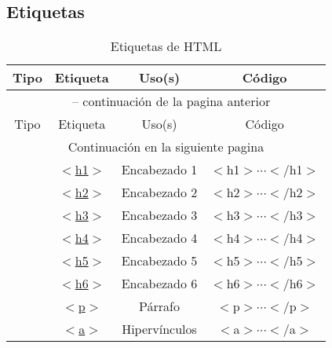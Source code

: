 \documentclass[12pt]{report}
\begin{document}
		\subsection{Etiquetas}
			\begin{longtable}{c >{\ttfamily} c c >{\ttfamily\footnotesize} c}
				\caption{Etiquetas de HTML}\\
				Tipo	&	Etiqueta	&	Uso(s)	&	Código	\\\hline
				\endfirsthead
				\multicolumn{4}{c}{\tablename\ \thetable{} -- continuación de la pagina anterior}\\
				Tipo	&	Etiqueta	&	Uso(s)	&	Código	\\\hline
				\endhead
				\hline\multicolumn{4}{c}{Continuación en la siguiente pagina}\\\hline
				\endfoot
				\hline
				\endlastfoot
				\multirow{7}{*}{\rotatebox[origin=c]{90}{De texto}}
					&	\href{https://developer.mozilla.org/es/docs/Web/HTML/Element/Heading_Elements}{$<$h1$>$}
						&	Encabezado 1	&	$<$h1$>\cdots<$/h1$>$	\\
					&	\href{https://developer.mozilla.org/es/docs/Web/HTML/Element/Heading_Elements}{$<$h2$>$}
						&	Encabezado 2	& $<$h2$>\cdots<$/h2$>$	\\
					&	\href{https://developer.mozilla.org/es/docs/Web/HTML/Element/Heading_Elements}{$<$h3$>$}
						&	Encabezado 3	& $<$h3$>\cdots<$/h3$>$	\\
					&	\href{https://developer.mozilla.org/es/docs/Web/HTML/Element/Heading_Elements}{$<$h4$>$}
						&	Encabezado 4	& $<$h4$>\cdots<$/h4$>$	\\
					&	\href{https://developer.mozilla.org/es/docs/Web/HTML/Element/Heading_Elements}{$<$h5$>$}
						&	Encabezado 5	& $<$h5$>\cdots<$/h5$>$	\\
					&	\href{https://developer.mozilla.org/es/docs/Web/HTML/Element/Heading_Elements}{$<$h6$>$}
						&	Encabezado 6	& $<$h6$>\cdots<$/h6$>$	\\
					&	\href{https://developer.mozilla.org/es/docs/Web/HTML/Element/p}{$<$p$>$}
						&	Párrafo				&	$<$p$>\cdots<$/p$>$	\\
					&	\href{https://developer.mozilla.org/es/docs/Web/HTML/Element/a}{$<$a$>$}
						&	Hipervínculos	&	$<$a$>\cdots<$/a$>$	\\

\end{longtable}
\end{document}
